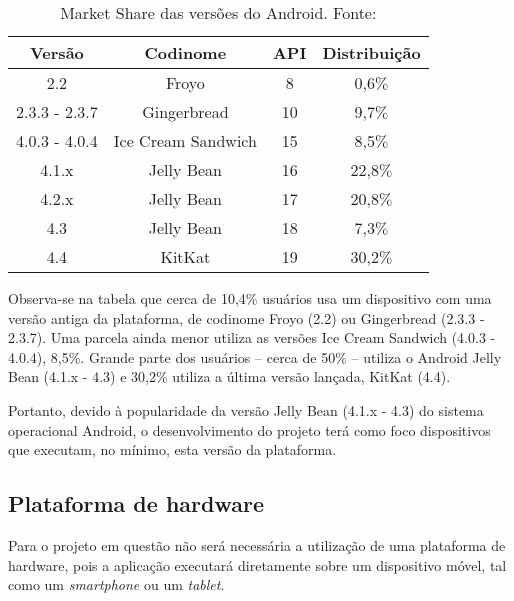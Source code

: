 \begin{table}[h!]

\caption[Market Share das versões do Android]{Market Share das versões do Android. Fonte: \cite{androidDevDashboards}}
\begin{center}
\begin{tabular}{|c|c|c|c|}
\hline
\textbf{Versão}     &\textbf{Codinome}      & \textbf{API}      &\textbf{Distribuição} \\ \hline \hline
2.2                 & Froyo                 & 8                 & 0,6$\%$	\\
2.3.3 - 2.3.7       & Gingerbread           & 10                & 9,7$\%$	\\
4.0.3 - 4.0.4       & Ice Cream Sandwich    & 15                & 8,5$\%$	\\
4.1.x               & Jelly Bean            & 16                & 22,8$\%$	\\
4.2.x               & Jelly Bean            & 17                & 20,8$\%$	\\
4.3                 & Jelly Bean            & 18                & 7,3$\%$	\\
4.4                 & KitKat                & 19                & 30,2$\%$	\\ \hline
\end{tabular}%
\end{center}
\label{tab:marketShare}
\end{table}

Observa-se na tabela que cerca de 10,4$\%$ usuários usa um dispositivo com uma versão antiga da plataforma, de codinome Froyo (2.2) ou Gingerbread (2.3.3 - 2.3.7). Uma parcela ainda menor utiliza as versões Ice Cream Sandwich (4.0.3 - 4.0.4), 8,5$\%$. Grande parte dos usuários -- cerca de 50$\%$ -- utiliza o Android Jelly Bean (4.1.x - 4.3) e 30,2$\%$ utiliza a última versão lançada, KitKat (4.4).

Portanto, devido à popularidade da versão Jelly Bean (4.1.x - 4.3) do sistema operacional Android, o desenvolvimento do projeto terá como foco dispositivos que executam, no mínimo, esta versão da plataforma.

\subsection{Plataforma de hardware}

Para o projeto em questão não será necessária a utilização de uma plataforma de hardware, pois a aplicação executará diretamente sobre um dispositivo móvel, tal como um \textit{smartphone} ou um \textit{tablet}.